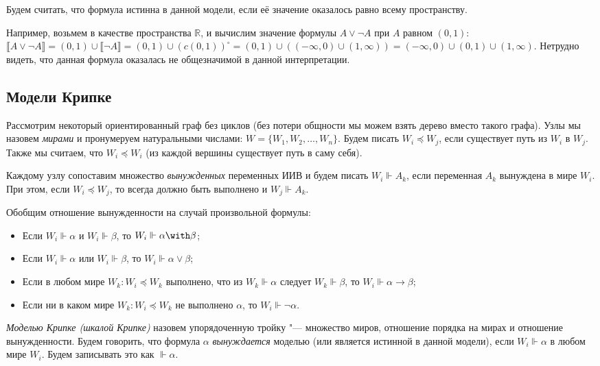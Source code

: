 Будем считать, что формула истинна в данной модели, если её значение оказалось равно
всему пространству. 

Например, возьмем в качестве пространства $\mathbb{R}$, и вычислим значение формулы $A \vee \neg A$ 
при $A$ равном $(0,1)$: $\llbracket A \vee \neg A \rrbracket = (0,1) \cup \llbracket \neg A \rrbracket = 
(0,1) \cup (c(0,1))^\circ = (0,1) \cup ((-\infty,0)\cup(1,\infty)) = (-\infty,0)\cup(0,1)\cup(1,\infty)$.
Нетрудно видеть, что данная формула оказалась не общезначимой в данной интерпретации.

\subsection{Модели Крипке}

\begin{definition}
Рассмотрим некоторый ориентированный граф без циклов (без потери общности мы можем взять дерево вместо такого графа). 
Узлы мы назовем \emph{мирами} и пронумеруем натуральными числами: $W = \{ W_1, W_2, \dots, W_n\}$. 
Будем писать $W_i \preceq W_j$, если существует путь из $W_i$ в $W_j$.
Также мы считаем, что $W_i \preceq W_i$ (из каждой вершины существует путь в саму себя).
\end{definition}

\begin{definition}
Каждому узлу сопоставим множество \emph{вынужденных} переменных ИИВ и будем писать $W_i \Vdash A_k$, 
если переменная $A_k$ вынуждена в мире $W_i$. При этом, если $W_i \preceq W_j$, 
то всегда должно быть выполнено и $W_j \Vdash A_k$.
\end{definition}

Обобщим отношение вынужденности на случай произвольной формулы:
\begin{itemize}
\item Если $W_i \Vdash \alpha$ и $W_i \Vdash \beta$, то $W_i \Vdash \alpha\with\beta$;
\item Если $W_i \Vdash \alpha$ или $W_i \Vdash \beta$, то $W_i \Vdash \alpha\vee\beta$;
\item Если в любом мире $W_k: W_i \preceq W_k$ выполнено, что из $W_k \Vdash \alpha$ следует $W_k \Vdash \beta$, 
то $W_i \Vdash \alpha\rightarrow\beta$;
\item Если ни в каком мире $W_k: W_i \preceq W_k$ не выполнено $\alpha$, то $W_i \Vdash \neg\alpha$.
\end{itemize}

\begin{definition}
\emph{Моделью Крипке (шкалой Крипке)} назовем упорядоченную тройку "--- множество миров, отношение 
порядка на мирах и отношение вынужденности.
Будем говорить, что формула $\alpha$ \emph{вынуждается} моделью (или является истинной в данной модели),
если $W_i \Vdash \alpha$ в любом мире $W_i$. Будем записывать это как $\Vdash \alpha$.
\end{definition}

